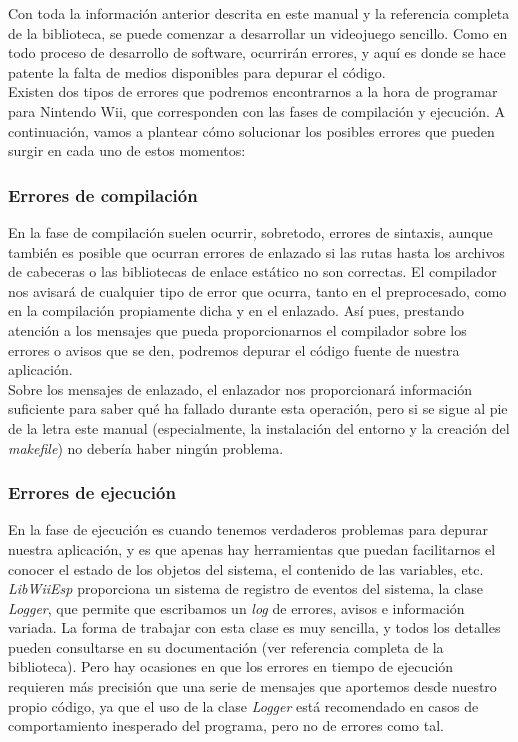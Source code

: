 Con toda la información anterior descrita en este manual y la referencia completa de la biblioteca, se puede comenzar a desarrollar un videojuego sencillo. Como en todo proceso de desarrollo de software, ocurrirán errores, y aquí es donde se hace patente la falta de medios disponibles para depurar el código.\\

Existen dos tipos de errores que podremos encontrarnos a la hora de programar para Nintendo Wii, que corresponden con las fases de compilación y ejecución. A continuación, vamos a plantear cómo solucionar los posibles errores que pueden surgir en cada uno de estos momentos:

\subsubsection{Errores de compilación}

En la fase de compilación suelen ocurrir, sobretodo, errores de sintaxis, aunque también es posible que ocurran errores de enlazado si las rutas hasta los archivos de cabeceras o las bibliotecas de enlace estático no son correctas. El compilador nos avisará de cualquier tipo de error que ocurra, tanto en el preprocesado, como en la compilación propiamente dicha y en el enlazado. Así pues, prestando atención a los mensajes que pueda proporcionarnos el compilador sobre los errores o avisos que se den, podremos depurar el código fuente de nuestra aplicación.\\

Sobre los mensajes de enlazado, el enlazador nos proporcionará información suficiente para saber qué ha fallado durante esta operación, pero si se sigue al pie de la letra este manual (especialmente, la instalación del entorno y la creación del \emph{makefile}) no debería haber ningún problema.

\subsubsection{Errores de ejecución}

En la fase de ejecución es cuando tenemos verdaderos problemas para depurar nuestra aplicación, y es que apenas hay herramientas que puedan facilitarnos el conocer el estado de los objetos del sistema, el contenido de las variables, etc.\\

\emph{LibWiiEsp} proporciona un sistema de registro de eventos del sistema, la clase \emph{Logger}, que permite que escribamos un \emph{log} de errores, avisos e información variada. La forma de trabajar con esta clase es muy sencilla, y todos los detalles pueden consultarse en su documentación (ver referencia completa de la biblioteca). Pero hay ocasiones en que los errores en tiempo de ejecución requieren más precisión que una serie de mensajes que aportemos desde nuestro propio código, ya que el uso de la clase \emph{Logger} está recomendado en casos de comportamiento inesperado del programa, pero no de errores como tal.\\

